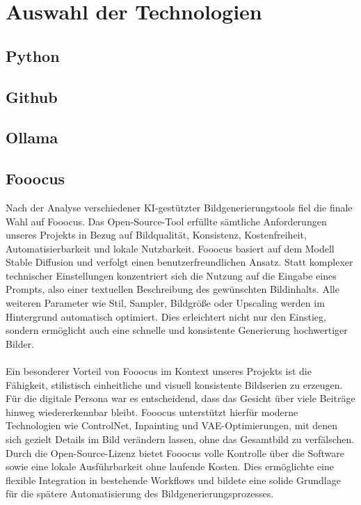 \documentclass[a4paper,12pt]{article}
\begin{document}
\section{Auswahl der Technologien}
\subsection{Python}
\subsection{Github}
\subsection{Ollama}
\subsection{Fooocus}

Nach der Analyse verschiedener KI-gestützter Bildgenerierungstools fiel die finale Wahl auf Fooocus. Das Open-Source-Tool erfüllte sämtliche Anforderungen unseres Projekts in Bezug auf Bildqualität, Konsistenz, Kostenfreiheit, Automatisierbarkeit und lokale Nutzbarkeit.
Fooocus basiert auf dem Modell Stable Diffusion und verfolgt einen benutzerfreundlichen Ansatz. Statt komplexer technischer Einstellungen konzentriert sich die Nutzung auf die Eingabe eines Prompts, also einer textuellen Beschreibung des gewünschten Bildinhalts. Alle weiteren Parameter wie Stil, Sampler, Bildgröße oder Upscaling werden im Hintergrund automatisch optimiert. Dies erleichtert nicht nur den Einstieg, sondern ermöglicht auch eine schnelle und konsistente Generierung hochwertiger Bilder. \\\\
Ein besonderer Vorteil von Fooocus im Kontext unseres Projekts ist die Fähigkeit, stilistisch einheitliche und visuell konsistente Bildserien zu erzeugen. Für die digitale Persona war es entscheidend, dass das Gesicht über viele Beiträge hinweg wiedererkennbar bleibt. Fooocus unterstützt hierfür moderne Technologien wie ControlNet, Inpainting und VAE-Optimierungen, mit denen sich gezielt Details im Bild verändern lassen, ohne das Gesamtbild zu verfälschen.
Durch die Open-Source-Lizenz bietet Fooocus volle Kontrolle über die Software sowie eine lokale Ausführbarkeit ohne laufende Kosten. Dies ermöglichte eine flexible Integration in bestehende Workflows und bildete eine solide Grundlage für die spätere Automatisierung des Bildgenerierungsprozesses.
\end{document}
